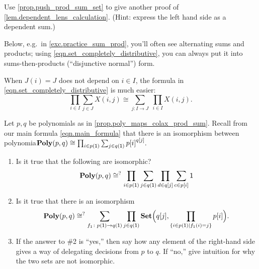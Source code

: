 \documentclass[Book-Poly]{subfiles}
\begin{document}
\begin{exercise}\label{ex.dependent_lens_calculation}
  Use \cref{prop.push_prod_sum_set} to give another proof of
  \cref{lem.dependent_lens_calculation}. (Hint: express the left hand side as a
  dependent sum.)
\end{exercise}

Below, e.g.\ in \cref{exc.practice_sum_prod}, you'll often see alternating sums and products; using \cref{eqn.set_completely_distributive}, you can always put it into sums-then-products (``disjunctive normal'') form.

When $J(i)=J$ does not depend on $i\in I$, the formula in \eqref{eqn.set_completely_distributive} is much easier:
\[
\prod_{i\in I}\sum_{j\in J}X(i,j)\cong\sum_{j\colon I\to J}\;\prod_{i\in I}X(i,j).
\]

\begin{exercise}\label{exc.practice_sum_prod}
Let $p,q$ be polynomials as in \cref{prop.poly_maps_colax_prod_sum}. Recall from
our main formula \eqref{eqn.main_formula} that there is an isomorphism between polynomia$\textbf{Poly}(p,q)\cong\prod_{i\in p(\textsf{1})}\sum_{j\in q(\textsf{1})}{p[i]}^{q[j]}.$ 
\begin{enumerate}
\item Is it true that the following are isomorphic?
\begin{equation}\label{eqn.poly_p_q}
  \textbf{Poly}(p,q)
  \cong^?
  \prod_{i\in p(\textsf{1})}\sum_{j\in q(\textsf{1})}\prod_{d\in q[j]}\sum_{c\in p[i]}\textsf{1}
\end{equation}
\item Is it true that there is an isomorphism
	\begin{equation}\label{eqn.useful_misc472}
	\textbf{Poly}(p,q)\cong^?\sum_{f_1\colon p(\textsf{1})\to q(\textsf{1})}\prod_{j\in q(\textsf{1})}\textbf{Set}\Big(q[j],\prod_{\{i\in p(\textsf{1})\mid f_1(i)= j\}}p[i]\Big).
	\end{equation}
\item If the answer to \#2 is ``yes,'' then say how any element of the right-hand side gives a way of delegating decisions from $p$ to $q$. If ``no,'' give intuition for why the two sets are not isomorphic.
\qedhere
\end{enumerate}
\end{exercise}


\end{document}

